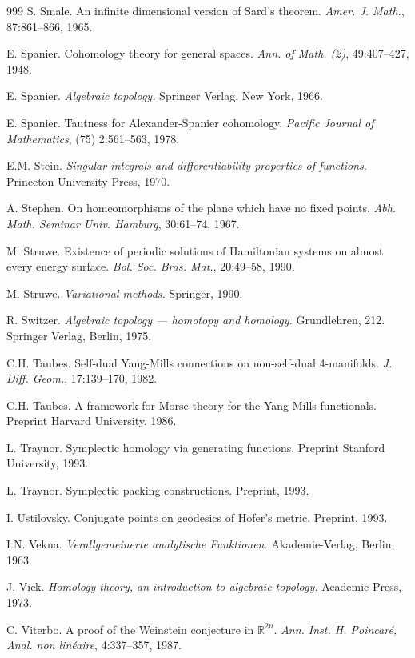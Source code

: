 \begin{thebibliography}{999}
 S. Smale. An infinite dimensional version of Sard's
theorem. \emph{Amer. J. Math.}, 87:861--866, 1965.

 E. Spanier. Cohomology theory for general spaces.
\emph{Ann. of Math. (2)}, 49:407--427, 1948.

 E. Spanier. \emph{Algebraic topology.} Springer Verlag,
New York, 1966.

 E. Spanier. Tautness for Alexander-Spanier cohomology.
\emph{Pacific Journal of Mathematics}, (75) 2:561--563, 1978.

 E.M. Stein. \emph{Singular integrals and differentiability
properties of functions.} Princeton University Press, 1970.

 A. Stephen. On homeomorphisms of the plane which have no
fixed points. \emph{Abh. Math. Seminar Univ. Hamburg}, 30:61--74, 1967.

 M. Struwe. Existence of periodic solutions of Hamiltonian
systems on almost every energy surface. \emph{Bol. Soc. Bras. Mat.},
20:49--58, 1990.

 M. Struwe. \emph{Variational methods.} Springer, 1990.

 R. Switzer. \emph{Algebraic topology --- homotopy and
homology.} Grundlehren, 212. Springer Verlag, Berlin, 1975.

 C.H. Taubes. Self-dual Yang-Mills connections on
non-self-dual 4-manifolds. \emph{J. Diff. Geom.}, 17:139--170, 1982.

 C.H. Taubes. A framework for Morse theory for the
Yang-Mills functionals. Preprint Harvard University, 1986.

 L. Traynor. Symplectic homology via generating functions.
Preprint Stanford University, 1993.

 L. Traynor. Symplectic packing constructions. Preprint,
1993.

 I. Ustilovsky. Conjugate points on geodesics of Hofer's
metric. Preprint, 1993.

 I.N. Vekua. \emph{Verallgemeinerte analytische
Funktionen.} Akademie-Verlag, Berlin, 1963.

 J. Vick. \emph{Homology theory, an introduction to
algebraic topology.} Academic Press, 1973.

 C. Viterbo. A proof of the Weinstein conjecture in
$\mathbb{R}^{2n}$. \emph{Ann. Inst. H. Poincaré, Anal. non linéaire},
4:337--357, 1987.


\end{thebibliography}
